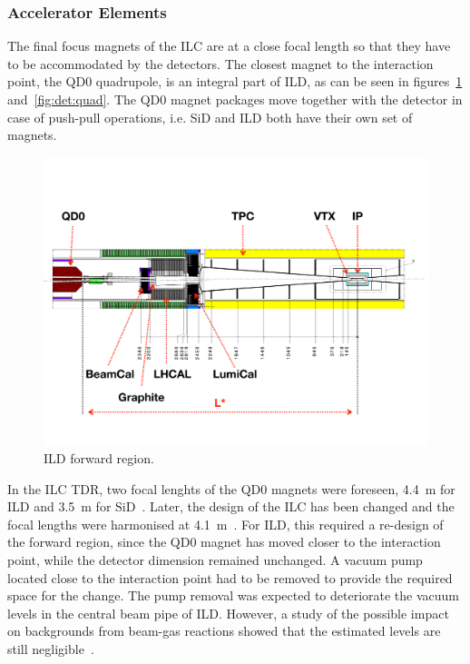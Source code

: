 \subsubsection{Accelerator Elements}
The final focus magnets of the ILC are at a close focal length so that they have to be accommodated by the detectors. The closest magnet to the interaction point, the QD0 quadrupole, is an integral part of ILD, as can be seen in figures~\ref{ild:fig:Forward_QD0} and~\ref{fig:det:quad}. The QD0 magnet packages move together with the detector in case of push-pull operations, i.e. SiD and ILD both have their own set of magnets.
\begin{figure}[h!]
\centering
\includegraphics[width=0.8\hsize]{ILC/figs/ILD_Forward_Region.pdf}
\caption{\label{ild:fig:Forward_QD0}ILD forward region.}
\end{figure}
In the ILC TDR, two focal lenghts of the QD0 magnets were foreseen, 4.4~m for ILD and 3.5~m for SiD~\cite{Behnke:2013xla}. Later, the design of the ILC has been changed and the focal lengths were harmonised at 4.1~m~\cite{ild:bib:lstar_cr}. For ILD, this required a re-design of the forward region, since the QD0 magnet has moved closer to the interaction point, while the detector dimension remained unchanged. A vacuum pump located close to the interaction point had to be removed to provide the required space for the change. The pump removal was expected to deteriorate the vacuum levels in the central beam pipe of ILD. However, a study of the possible impact on backgrounds from beam-gas reactions showed that the estimated levels are still negligible~\cite{ild:bib:beam_gas}.
